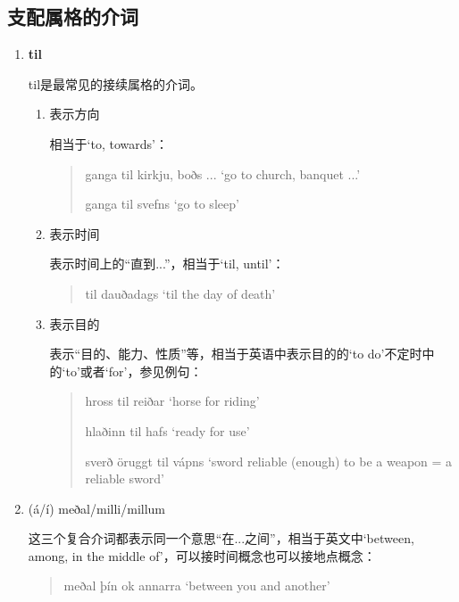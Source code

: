 \subsection{支配属格的介词}
\begin{enumerate}[itemindent=1em, label=\textbf{\arabic*}.]
    \item \textbf{til}

          til是最常见的接续属格的介词。
          \begin{enumerate}
              \item 表示方向

                    相当于`to, towards'：
                    \begin{quote}
                        ganga til kirkju, boðs ... `go to  church, banquet ...'

                        ganga til svefns `go to sleep'
                    \end{quote}

              \item 表示时间

                    表示时间上的“直到...”，相当于`til, until'：
                    \begin{quote}
                        til dauðadags `til the day of death'
                    \end{quote}

              \item 表示目的

                    表示“目的、能力、性质”等，相当于英语中表示目的的`to do'不定时中的`to'或者`for'，参见例句：
                    \begin{quote}
                        hross til reiðar `horse for riding'

                        hlaðinn til hafs `ready for use'

                        sverð öruggt til vápns `sword reliable (enough) to be a weapon = a reliable sword'
                    \end{quote}
          \end{enumerate}

    \item (á/í) meðal/milli/millum

          这三个复合介词都表示同一个意思“在...之间”，相当于英文中`between, among, in the middle of'，可以接时间概念也可以接地点概念：
          \begin{quote}
              meðal þín ok annarra `between you and another'


\end{quote}
\end{enumerate}
